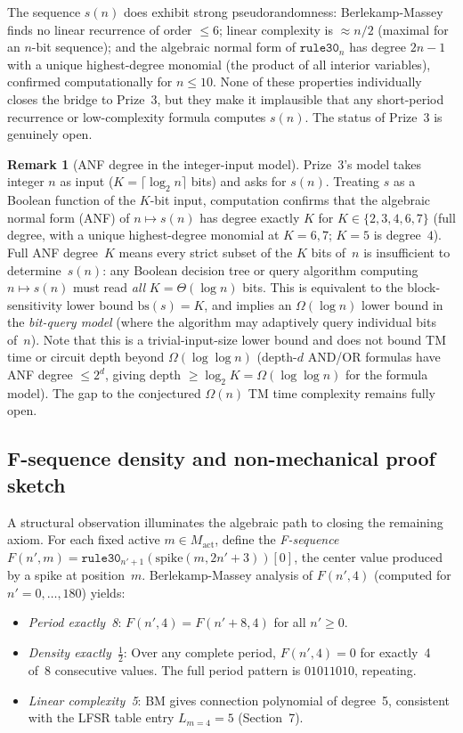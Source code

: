 \documentclass[11pt]{article}
\theoremstyle{plain}
\theoremstyle{definition}
\newtheorem{remark}[theorem]{Remark}
\begin{document}
The sequence $s(n)$ does exhibit strong pseudorandomness: Berlekamp-Massey finds
no linear recurrence of order $\leq 6$; linear complexity is ${\approx}n/2$ (maximal
for an $n$-bit sequence); and the algebraic normal form of $\mathtt{rule30}_n$ has
degree $2n{-}1$ with a unique highest-degree monomial (the product of all interior
variables), confirmed computationally for $n \leq 10$.  None of these properties
individually closes the bridge to Prize~3, but they make it implausible that any
short-period recurrence or low-complexity formula computes $s(n)$.  The
status of Prize~3 is genuinely open.

\begin{remark}[ANF degree in the integer-input model]
\label{rem:integermodel}
Prize~3's model takes integer $n$ as input ($K = \lceil \log_2 n \rceil$ bits) and asks
for $s(n)$.  Treating $s$ as a Boolean function of the $K$-bit input, computation
confirms that the algebraic normal form (ANF) of $n \mapsto s(n)$ has degree exactly $K$
for $K \in \{2,3,4,6,7\}$ (full degree, with a unique highest-degree monomial at
$K=6,7$; $K=5$ is degree~$4$).  Full ANF degree~$K$ means every strict subset of the
$K$ bits of~$n$ is insufficient to determine~$s(n)$: any Boolean decision tree or
query algorithm computing $n \mapsto s(n)$ must read \emph{all} $K = \Theta(\log n)$ bits.
This is equivalent to the block-sensitivity lower bound $\mathrm{bs}(s) = K$, and implies
an $\Omega(\log n)$ lower bound in the \emph{bit-query model} (where the algorithm
may adaptively query individual bits of~$n$).  Note that this is a trivial-input-size
lower bound and does not bound TM time or circuit depth beyond $\Omega(\log\log n)$
(depth-$d$ AND/OR formulas have ANF degree $\leq 2^d$, giving depth $\geq \log_2 K
= \Omega(\log\log n)$ for the formula model).  The gap to
the conjectured $\Omega(n)$ TM time complexity remains fully open.
\end{remark}

\subsection*{F-sequence density and non-mechanical proof sketch}
\label{sec:density}

A structural observation illuminates the algebraic path to closing the remaining axiom.
For each fixed active $m \in M_{\mathrm{act}}$, define the \emph{F-sequence}
$F(n', m) = \mathtt{rule30}_{n'+1}(\mathrm{spike}(m, 2n'+3))[0]$, the center value
produced by a spike at position~$m$.  Berlekamp-Massey analysis of $F(n', 4)$
(computed for $n' = 0,\ldots,180$) yields:
\begin{itemize}
  \item \emph{Period exactly~8}: $F(n',4) = F(n'+8, 4)$ for all $n' \geq 0$.
  \item \emph{Density exactly~$\frac{1}{2}$}: Over any complete period,
    $F(n',4) = 0$ for exactly~4 of~8 consecutive values.
    The full period pattern is $01011010$, repeating.
  \item \emph{Linear complexity~5}: BM gives connection polynomial of degree~5,
    consistent with the LFSR table entry $L_{m=4} = 5$ (Section~7).
\end{itemize}
\end{document}
